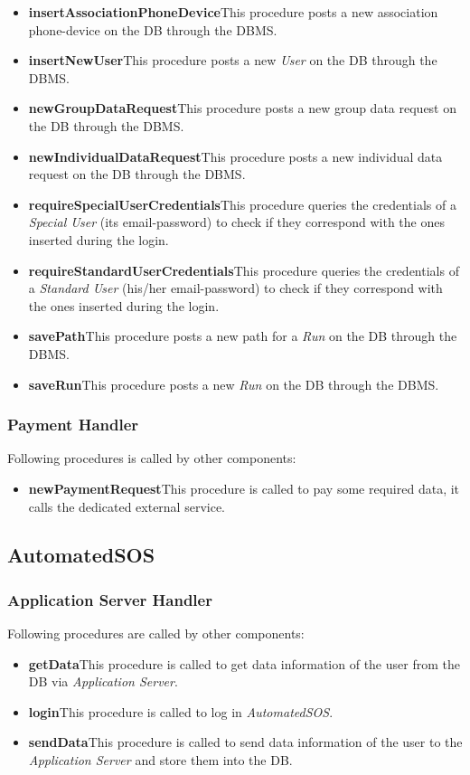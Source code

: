 \begin{itemize}
  \item \textbf{insertAssociationPhoneDevice}\quad This procedure posts a new association phone-device on the DB through the DBMS.
  \item \textbf{insertNewUser}\quad This procedure posts a new \textit{User} on the DB through the DBMS.
  \item \textbf{newGroupDataRequest}\quad This procedure posts a new group data request on the DB through the DBMS.
  \item \textbf{newIndividualDataRequest}\quad This procedure posts a new individual data request on the DB through the DBMS.
  \item \textbf{requireSpecialUserCredentials}\quad This procedure queries the credentials of a \textit{Special User} (its email-password) to check if they correspond with the ones inserted during the login.
  \item \textbf{requireStandardUserCredentials}\quad This procedure queries the credentials of a \textit{Standard User} (his/her email-password) to check if they correspond with the ones inserted during the login.
  \item \textbf{savePath}\quad This procedure posts a new path for a \textit{Run} on the DB through the DBMS.
  \item \textbf{saveRun}\quad This procedure posts a new \textit{Run} on the DB through the DBMS.
\end{itemize}

\subsubsection{Payment Handler}
Following procedures is called by other components:
\begin{itemize}
  \item \textbf{newPaymentRequest}\quad This procedure is called to pay some required data, it calls the dedicated external service.
\end{itemize}

\subsection{AutomatedSOS}
\subsubsection{Application Server Handler}
Following procedures are called by other components:
\begin{itemize}
  \item \textbf{getData}\quad This procedure is called to get data information of the user from the DB via \textit{Application Server}.
  \item \textbf{login}\quad This procedure is called to log in \textit{AutomatedSOS}.
  \item \textbf{sendData}\quad This procedure is called to send data information of the user to the \textit{Application Server} and store them into the DB.
\end{itemize}


